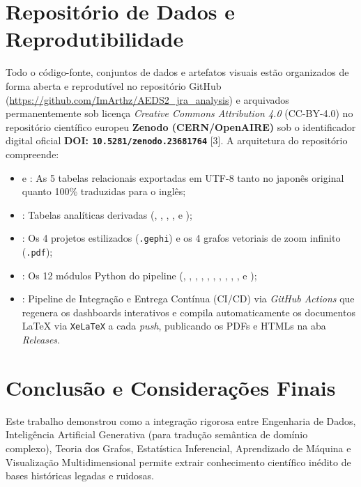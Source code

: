 \documentclass[conference]{IEEEtran}
\begin{document}
\section{Repositório de Dados e Reprodutibilidade}
Todo o código-fonte, conjuntos de dados e artefatos visuais estão organizados de forma aberta e reprodutível no repositório GitHub (\url{https://github.com/ImArthz/AEDS2_jra_analysis}) e arquivados permanentemente sob licença \textit{Creative Commons Attribution 4.0} (CC-BY-4.0) no repositório científico europeu \textbf{Zenodo (CERN/OpenAIRE)} sob o identificador digital oficial \textbf{DOI: \texttt{10.5281/zenodo.23681764}} [3]. A arquitetura do repositório compreende:
\begin{itemize}
    \item {} e : As 5 tabelas relacionais exportadas em UTF-8 tanto no japonês original quanto 100\%
traduzidas para o inglês;
    \item {}: Tabelas analíticas derivadas (, , , ,  e );
    \item {}: Os 4 projetos estilizados (\texttt{.gephi}) e os 4 grafos vetoriais de zoom infinito (\texttt{.pdf});
    \item {}: Os 12 módulos Python do pipeline (, , , , , , , , , ,  e );
    \item {}: Pipeline de Integração e Entrega Contínua (CI/CD) via \textit{GitHub Actions} que regenera os dashboards interativos e compila automaticamente os documentos LaTeX via \texttt{XeLaTeX} a cada \textit{push}, publicando os PDFs e HTMLs na aba \textit{Releases}.
\end{itemize}

\section{Conclusão e Considerações Finais}
Este trabalho demonstrou como a integração rigorosa entre Engenharia de Dados, Inteligência Artificial Generativa (para tradução semântica de domínio complexo), Teoria dos Grafos, Estatística Inferencial, Aprendizado de Máquina e Visualização Multidimensional permite extrair conhecimento científico inédito de bases históricas legadas e ruidosas.
\end{document}
